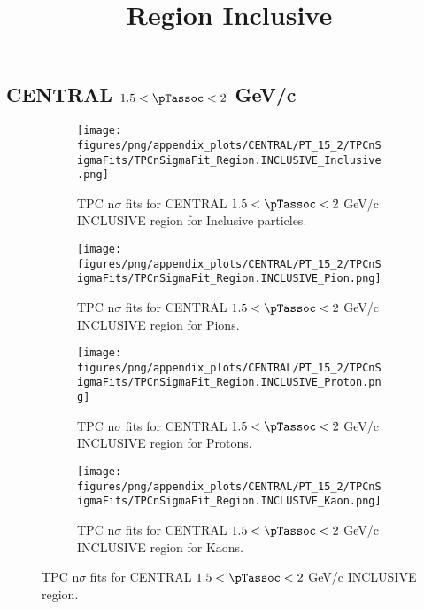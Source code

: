     
            \subsection*{CENTRAL $1.5 < \pTassoc < 2$ GeV/c}
            \begin{figure}[H]
                \title{Region Inclusive}
                \begin{subfigure}[b]{0.5\textwidth}
                    \centering
                    \texttt{[image: figures/png/appendix\_plots/CENTRAL/PT\_15\_2/TPCnSigmaFits/TPCnSigmaFit\_Region.INCLUSIVE\_Inclusive.png]}
                    \caption{TPC n$\sigma$ fits for CENTRAL $1.5 < \pTassoc < 2$ GeV/c INCLUSIVE region for Inclusive particles.}
                    \label{fig:appendix_CENTRAL_$1.5 < \pTassoc < 2$ GeV/c_INCLUSIVE_Inclusive}
                \end{subfigure}
                \begin{subfigure}[b]{0.5\textwidth}
                    \centering
                    \texttt{[image: figures/png/appendix\_plots/CENTRAL/PT\_15\_2/TPCnSigmaFits/TPCnSigmaFit\_Region.INCLUSIVE\_Pion.png]}
                    \caption{TPC n$\sigma$ fits for CENTRAL $1.5 < \pTassoc < 2$ GeV/c INCLUSIVE region for Pions.}
                    \label{fig:appendix_CENTRAL_$1.5 < \pTassoc < 2$ GeV/c_INCLUSIVE_Pion}
                \end{subfigure}
                \begin{subfigure}[b]{0.5\textwidth}
                    \centering
                    \texttt{[image: figures/png/appendix\_plots/CENTRAL/PT\_15\_2/TPCnSigmaFits/TPCnSigmaFit\_Region.INCLUSIVE\_Proton.png]}
                    \caption{TPC n$\sigma$ fits for CENTRAL $1.5 < \pTassoc < 2$ GeV/c INCLUSIVE region for Protons.}
                    \label{fig:appendix_CENTRAL_$1.5 < \pTassoc < 2$ GeV/c_INCLUSIVE_Proton}
                \end{subfigure}
                \begin{subfigure}[b]{0.5\textwidth}
                    \centering
                    \texttt{[image: figures/png/appendix\_plots/CENTRAL/PT\_15\_2/TPCnSigmaFits/TPCnSigmaFit\_Region.INCLUSIVE\_Kaon.png]}
                    \caption{TPC n$\sigma$ fits for CENTRAL $1.5 < \pTassoc < 2$ GeV/c INCLUSIVE region for Kaons.}
                    \label{fig:appendix_CENTRAL_$1.5 < \pTassoc < 2$ GeV/c_INCLUSIVE_Kaon}
                \end{subfigure}
                \caption{TPC n$\sigma$ fits for CENTRAL $1.5 < \pTassoc < 2$ GeV/c INCLUSIVE region.}
                \label{fig:appendix_CENTRAL_$1.5 < \pTassoc < 2$ GeV/c_INCLUSIVE}
            \end{figure}
